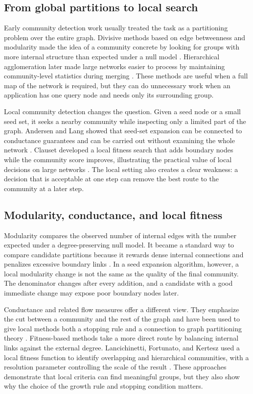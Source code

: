 \documentclass[10pt,journal,compsoc]{IEEEtran}
\begin{document}
\subsection{From global partitions to local search}
Early community detection work usually treated the task as a partitioning
problem over the entire graph. Divisive methods based on edge betweenness and
modularity made the idea of a community concrete by looking for groups with
more internal structure than expected under a null model
\cite{newman2004,fortunato2010}. Hierarchical agglomeration later made large
networks easier to process by maintaining community-level statistics during
merging \cite{clauset2004}. These methods are useful when a full map of the
network is required, but they can do unnecessary work when an application has
one query node and needs only its surrounding group.

Local community detection changes the question. Given a seed node or a small
seed set, it seeks a nearby community while inspecting only a limited part of
the graph. Andersen and Lang showed that seed-set expansion can be connected
to conductance guarantees and can be carried out without examining the whole
network \cite{andersen2006}. Clauset developed a local fitness search that
adds boundary nodes while the community score improves, illustrating the
practical value of local decisions on large networks \cite{clauset2005}.
The local setting also creates a clear weakness: a decision that is acceptable
at one step can remove the best route to the community at a later step.

\subsection{Modularity, conductance, and local fitness}
Modularity compares the observed number of internal edges with the number
expected under a degree-preserving null model. It became a standard way to
compare candidate partitions because it rewards dense internal connections
and penalizes excessive boundary links \cite{newman2006}. In a seed expansion
algorithm, however, a local modularity change is not the same as the quality
of the final community. The denominator changes after every addition, and a
candidate with a good immediate change may expose poor boundary nodes later.

Conductance and related flow measures offer a different view. They emphasize
the cut between a community and the rest of the graph and have been used to
give local methods both a stopping rule and a connection to graph partitioning
theory \cite{andersen2006}. Fitness-based methods take a more direct route by
balancing internal links against the external degree. Lancichinetti, Fortunato,
and Kertesz used a local fitness function to identify overlapping and
hierarchical communities, with a resolution parameter controlling the scale of
the result \cite{lancichinetti2009}. These approaches demonstrate that local
criteria can find meaningful groups, but they also show why the choice of the
growth rule and stopping condition matters.
\end{document}
